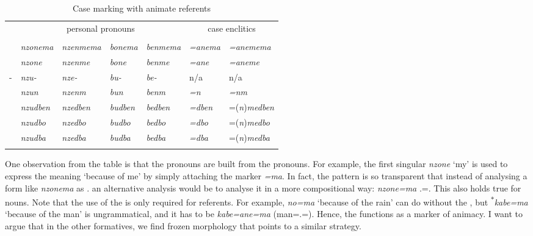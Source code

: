 \begin{table}
\begin{center}
\caption{Case marking with animate referents} 
\label{casediscussionss} 
	\begin{tabularx}{\textwidth}{XXXXXXl}	
		\lsptoprule
		&\multicolumn{4}{c}{{personal pronouns}}&\multicolumn{2}{c}{{case enclitics}}\\
		&\Fsg{}&{\Fnsg}&\Ssg{}&\Snsg{}&{\Sg}&{\Nsg}\\ \midrule
		{\Char}&\emph{nzonema}&\emph{nzenmema}&\emph{bonema}&\emph{benmema}&\emph{=anema}&\emph{=anemema}\\
		{\Poss}&\emph{nzone}&\emph{nzenme}&\emph{bone}&\emph{benme}&\emph{=ane}&\emph{=aneme}\\ 
		\Poss-&\emph{nzu-}&\emph{nze-}&\emph{bu-}&\emph{be-}&n/a&n/a\\ 
		{\Dat}&\emph{nzun}&\emph{nzenm}&\emph{bun}&\emph{benm}&\emph{=n}&\emph{=nm}\\ 
		{\Loc}&\emph{nzudben}&\emph{nzedben}&\emph{budben}&\emph{bedben}&\emph{=dben}&=(\emph{n})\emph{medben}\\ 
		{\All}&\emph{nzudbo}&\emph{nzedbo}&\emph{budbo}&\emph{bedbo}&\emph{=dbo}&=(\emph{n})\emph{medbo}\\ 
		{\Abl}&\emph{nzudba}&\emph{nzedba}&\emph{budba}&\emph{bedba}&\emph{=dba}&=(\emph{n})\emph{medba}\\ 
		\lspbottomrule
	\end{tabularx}
\end{center}
\end{table}%

One observation from the table is that the  pronouns are built from the  pronouns. For example, the first singular  \emph{nzone} `my' is used to express the meaning `because of me' by simply attaching the   marker \emph{=ma}. In fact, the pattern is so transparent that instead of analysing a form like \emph{nzonema} as \Fsg.{\Char} an alternative analysis would be to analyse it in a more compositional way: \emph{nzone=ma} \Fsg.\Poss={\Char}. This also holds true for nouns. Note that the use of the  is only required for  referents. For example, \emph{no=ma} `because of the rain' can do without the , but \textsuperscript{$\ast$}\emph{kabe=ma} `because of the man' is ungrammatical, and it has to be \emph{kabe=ane=ma} (man=\Poss.\Sg=\Char). Hence, the  functions as a marker of animacy. I want to argue that in the other  formatives, we find frozen morphology that points to a similar strategy.


